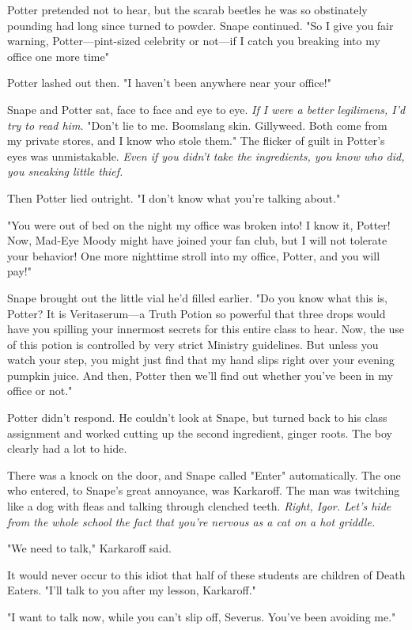 Potter pretended not to hear, but the scarab beetles he was so obstinately pounding had long since turned to powder. Snape continued. "So I give you fair warning, Potter—pint-sized celebrity or not—if I catch you breaking into my office one more time{\el}"

Potter lashed out then. "I haven't been anywhere near your office!"

Snape and Potter sat, face to face and eye to eye. \emph{If I were a better legilimens, I'd try to read him.} "Don't lie to me. Boomslang skin. Gillyweed. Both come from my private stores, and I know who stole them." The flicker of guilt in Potter's eyes was unmistakable. \emph{Even if you didn't take the ingredients, you know who did, you sneaking little thief.}

Then Potter lied outright. "I don't know what you're talking about."

"You were out of bed on the night my office was broken into! I know it, Potter! Now, Mad-Eye Moody might have joined your fan club, but I will not tolerate your behavior! One more nighttime stroll into my office, Potter, and you will pay!"

Snape brought out the little vial he'd filled earlier. "Do you know what this is, Potter? It is Veritaserum—a Truth Potion so powerful that three drops would have you spilling your innermost secrets for this entire class to hear. Now, the use of this potion is controlled by very strict Ministry guidelines. But unless you watch your step, you might just find that my hand slips right over your evening pumpkin juice. And then, Potter{\el} then we'll find out whether you've been in my office or not."

Potter didn't respond. He couldn't look at Snape, but turned back to his class assignment and worked cutting up the second ingredient, ginger roots. The boy clearly had a lot to hide.

There was a knock on the door, and Snape called "Enter" automatically. The one who entered, to Snape's great annoyance, was Karkaroff. The man was twitching like a dog with fleas and talking through clenched teeth. \emph{Right, Igor. Let's hide from the whole school the fact that you're nervous as a cat on a hot griddle.}

"We need to talk," Karkaroff said.

It would never occur to this idiot that half of these students are children of Death Eaters. "I'll talk to you after my lesson, Karkaroff."

"I want to talk now, while you can't slip off, Severus. You've been avoiding me."

